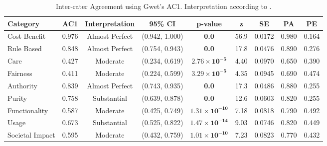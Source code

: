 \begin{table}[!hptb]
\centering
\begin{tabular}{l|cccccccc}
\hline
\textbf{Category} & \textbf{AC1} & \textbf{Interpretation} & \textbf{95\% CI} & \textbf{p-value} & \textbf{z} & \textbf{SE} & \textbf{PA} & \textbf{PE} \\ \hline
Cost Benefit & 0.976 & Almost Perfect & (0.942, 1.000) & \textbf{0.0} & 56.9 & 0.0172 & 0.980 & 0.164 \\ 
Rule Based & 0.848 & Almost Perfect & (0.754, 0.943) & \textbf{0.0} & 17.8 & 0.0476 & 0.890 & 0.276 \\
Care & 0.427 & Moderate & (0.234, 0.619) & $\mathbf{2.76 \times 10^{-5}}$ & 4.40 & 0.0970 & 0.650 & 0.390 \\
Fairness & 0.411 & Moderate & (0.224, 0.599) & $\mathbf{3.29 \times 10^{-5}}$ & 4.35 & 0.0945 & 0.690 & 0.474 \\
Authority & 0.839 & Almost Perfect & (0.743, 0.935) & \textbf{0.0} & 17.3 & 0.0486 & 0.880 & 0.255 \\
Purity & 0.758 & Substantial & (0.639, 0.878) & \textbf{0.0} & 12.6 & 0.0603 & 0.820 & 0.255 \\
Functionality & 0.587 & Moderate & (0.425, 0.749) & $\mathbf{1.31 \times 10^{-10}}$ & 7.18 & 0.0818 & 0.790 & 0.492 \\
Usage & 0.673 & Substantial & (0.525, 0.822) & $\mathbf{1.47 \times 10^{-14}}$ & 9.03 & 0.0746 & 0.820 & 0.449 \\
Societal Impact & 0.595 & Moderate & (0.432, 0.759) & $\mathbf{1.01 \times 10^{-10}}$ & 7.23 & 0.0823 & 0.770 & 0.432 \\
\hline
\end{tabular}
\caption{Inter-rater Agreement using Gwet's AC1. Interpretation according to \citep{wongpakaran2013comparison}.}
\label{tab:irr-results}
\end{table}